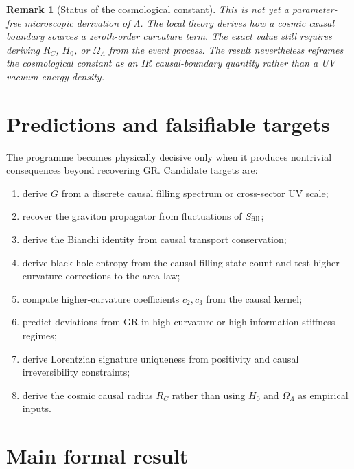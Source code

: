 \documentclass[11pt]{article}
\newtheorem{remark}[definition]{Remark}
\begin{document}
\begin{remark}[Status of the cosmological constant]
This is not yet a parameter-free microscopic derivation of $\Lambda$. The local theory derives how a cosmic causal boundary sources a zeroth-order curvature term. The exact value still requires deriving $R_C$, $H_0$, or $\Omega_\Lambda$ from the event process. The result nevertheless reframes the cosmological constant as an IR causal-boundary quantity rather than a UV vacuum-energy density.
\end{remark}

\section{Predictions and falsifiable targets}

The programme becomes physically decisive only when it produces nontrivial consequences beyond recovering GR. Candidate targets are:
\begin{enumerate}[label=(\roman*)]
\item derive $G$ from a discrete causal filling spectrum or cross-sector UV scale;
\item recover the graviton propagator from fluctuations of $S_{\rm fill}$;
\item derive the Bianchi identity from causal transport conservation;
\item derive black-hole entropy from the causal filling state count and test higher-curvature corrections to the area law;
\item compute higher-curvature coefficients $c_2,c_3$ from the causal kernel;
\item predict deviations from GR in high-curvature or high-information-stiffness regimes;
\item derive Lorentzian signature uniqueness from positivity and causal irreversibility constraints;
\item derive the cosmic causal radius $R_C$ rather than using $H_0$ and $\Omega_\Lambda$ as empirical inputs.
\end{enumerate}

\section{Main formal result}
\end{document}
